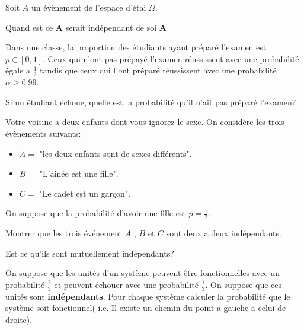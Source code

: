 \documentclass[11pt,largemargins]{homework}
\begin{document}
\maketitle


Soit $A$ un évènement de l'espace d'étai $\Omega$.
\begin{arabicparts}
  \item Quand est ce $\mathbf{A}$ serait indépendant de soi $\mathbf{A}$
\end{arabicparts}

Dans une classe, la proportion des étudiants ayant préparé l'examen est $p \in
[0,1]$. Ceux qui n'ont pas prépayé l'examen réussissent avec une probabilité
égale a $\frac{1}{2}$ tandis que ceux qui l'ont préparé réussissent avec une
probabilité $\alpha \geq 0.99$.

\begin{arabicparts}
\item Si un étudiant échoue, quelle est la probabilité qu'il n'ait pas préparé
  l'examen? 
\end{arabicparts}

Votre voisine a deux enfants dont vous ignorez le sexe. On considère les trois
évènements suivants:

\begin{itemize}
  \item $A = $  {"\small les deux enfants sont de sexes différents"}.
  \item $B = $  {"\small L'ainée est une fille"}.
  \item $C = $  {"\small Le cadet est un garçon"}.
\end{itemize}
    On suppose que la probabilité d'avoir une fille est $p = \frac{1}{2}$.\\
    \begin{arabicparts}
        \item Montrer que les trois événement $A$ , $B$ et $C$ sont deux a
          deux indépendants.
        \item Est ce qu'ils sont mutuellement indépendants?
    \end{arabicparts}


On suppose que les unités d'un système peuvent être fonctionnelles avec un
probabilité $\frac{2}{3}$ et peuvent échouer avec une probabilité $\frac{1}{3}$.
On suppose que ces unités sont \textbf{indépendants}. Pour chaque système
calculer la probabilité que le système soit fonctionnel( i.e. Il existe un
chemin du point a gauche a celui de droite).
\end{document}
